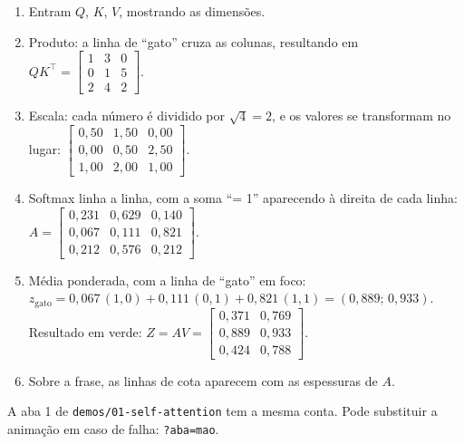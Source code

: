 \documentclass[11pt,a4paper]{article}
\newenvironment{barralateral}[2]{%
  \def\FrameCommand{{\color{#1}\vrule width 2pt}\hspace{7pt}}%
  \MakeFramed{\advance\hsize-\width\FrameRestore}%
  \noindent{\small\bfseries\color{#1}\MakeUppercase{#2}}\par\nopagebreak
}{\endMakeFramed}
\begin{document}
\begin{enumerate}
\item Entram $Q$, $K$, $V$, mostrando as dimensões.
\item Produto: a linha de “gato” cruza as colunas, resultando em
$QK^\top=\begin{bmatrix}1&3&0\\0&1&5\\2&4&2\end{bmatrix}$.
\item Escala: cada número é dividido por $\sqrt{4}=2$, e os valores se transformam no lugar:
$\begin{bmatrix}0{,}50&1{,}50&0{,}00\\0{,}00&0{,}50&2{,}50\\1{,}00&2{,}00&1{,}00\end{bmatrix}$.
\item Softmax linha a linha, com a soma “= 1” aparecendo à direita de cada linha:
$A=\begin{bmatrix}0{,}231&0{,}629&0{,}140\\0{,}067&0{,}111&0{,}821\\0{,}212&0{,}576&0{,}212\end{bmatrix}$.
\item Média ponderada, com a linha de “gato” em foco: $z_{\text{gato}}=0{,}067\,(1,0)+0{,}111\,(0,1)+0{,}821\,(1,1)=(0{,}889;\,0{,}933)$. Resultado em verde:
$Z=AV=\begin{bmatrix}0{,}371&0{,}769\\0{,}889&0{,}933\\0{,}424&0{,}788\end{bmatrix}$.
\item Sobre a frase, as linhas de cota aparecem com as espessuras de $A$.
\end{enumerate}
\begin{barralateral}{verde}{Demonstração}
A aba 1 de \texttt{demos/\allowbreak{}01-self-attention} tem a mesma conta. Pode substituir a animação em caso de falha: \texttt{?aba=mao}.

\end{barralateral}
\end{document}
